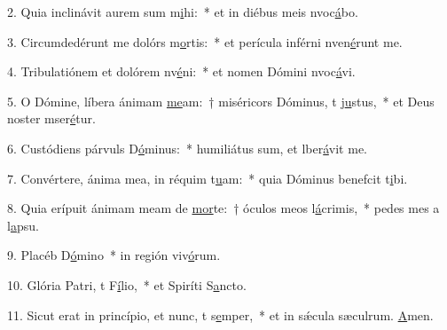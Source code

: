 2. Quia inclinávit aurem sum m\uline{i}hi:~* et in diébus meis nvoc\uline{á}bo.\par 
3. Circumdedérunt me dolórs m\uline{o}rtis:~* et perícula inférni nven\uline{é}runt me.\par 
4. Tribulatiónem et dolórem nv\uline{é}ni:~* et nomen Dómini nvoc\uline{á}vi.\par 
5. O Dómine, líbera ánimam \uline{me}am:~† miséricors Dóminus, t j\uline{u}stus,~* et Deus noster mser\uline{é}tur.\par 
6. Custódiens párvuls D\uline{ó}minus:~* humiliátus sum, et lber\uline{á}vit me.\par 
7. Convértere, ánima mea, in réquim t\uline{u}am:~* quia Dóminus benefcit t\uline{i}bi.\par 
8. Quia erípuit ánimam meam de \uline{mor}te:~† óculos meos  l\uline{á}crimis,~* pedes mes a l\uline{a}psu.\par 
9. Placéb D\uline{ó}mino~* in región viv\uline{ó}rum.\par 
10. Glória Patri, t F\uline{í}lio,~* et Spiríti S\uline{a}ncto.\par 
11. Sicut erat in princípio, et nunc, t s\uline{e}mper,~* et in sǽcula sæculrum. \uline{A}men.\par 
